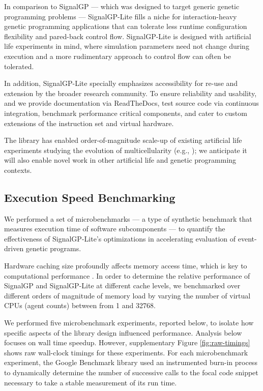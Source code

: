 In comparison to SignalGP --- which was designed to target generic genetic programming problems --- SignalGP-Lite fills a niche for interaction-heavy genetic programming applications that can tolerate less runtime configuration flexibility and pared-back control flow.
SignalGP-Lite is designed with artificial life experiments in mind, where simulation parameters need not change during execution and a more rudimentary approach to control flow can often be tolerated.

In addition, SignalGP-Lite specially emphasizes accessibility for re-use and extension by the broader research community.
To ensure reliability and usability, and we provide documentation via ReadTheDocs, test source code via continuous integration, benchmark performance critical components, and cater to custom extensions of the instruction set and virtual hardware.

The library has enabled order-of-magnitude scale-up of existing artificial life experiments studying the evolution of multicellularity (e.g., \citep{moreno2021exploring,moreno2021case}); we anticipate it will also enable novel work in other artificial life and genetic programming contexts.

\subsection{Execution Speed Benchmarking}

We performed a set of microbenchmarks --- a type of synthetic benchmark that measures execution time of software subcomponents --- to quantify the effectiveness of SignalGP-Lite's optimizations in accelerating evaluation of event-driven genetic programs.

Hardware caching size profoundly affects memory access time, which is key to computational performance \citep{skadron1999branch}.
In order to determine the relative performance of SignalGP and SignalGP-Lite at different cache levels, we benchmarked over different orders of magnitude of memory load by varying the number of virtual CPUs (agent counts) between from 1 and 32768.

We performed five microbenchmark experiments, reported below, to isolate how specific aspects of the library design influenced performance.
Analysis below focuses on wall time speedup.
However, supplementary Figure \ref{fig:raw-timings} shows raw wall-clock timings for these experiments.
For each microbenchmark experiment, the Google Benchmark library used an instrumented burn-in process to dynamically determine the number of successive calls to the focal code snippet necessary to take a stable measurement of its run time.

